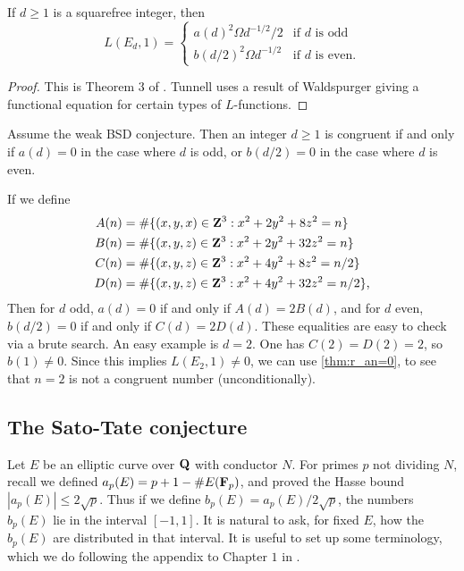 \begin{theorem}[Tunnell]
If $d\geqslant 1$ is a squarefree integer, then 
\[
  L(E_d,1) = 
    \begin{cases}
      a(d)^2 \Omega d^{-1/2}/2 & \text{if $d$ is odd} \\
      b(d/2)^2 \Omega d^{-1/2} & \text{if $d$ is even} \text{.}
    \end{cases}
\]
\end{theorem}
\begin{proof}
This is Theorem 3 of \cite{tu83}. Tunnell uses a result of Waldspurger giving 
a functional equation for certain types of $L$-functions. 
\end{proof}

\begin{corollary}
Assume the weak BSD conjecture. Then an integer $d\geqslant 1$ is congruent if 
and only if $a(d)=0$ in the case where $d$ is odd, or $b(d/2)=0$ in the case 
where $d$ is even. 
\end{corollary}

If we define 
\begin{align*}
  A(n) &= \# \{(x,y,x)\in \mathbf{Z}^3 : x^2 + 2 y^2 + 8 z^2 = n\} \\
  B(n) &= \# \{(x,y,z)\in \mathbf{Z}^3 : x^2 + 2 y^2 + 32 z^2 = n \} \\
  C(n) &= \# \{(x,y,z)\in \mathbf{Z}^3 : x^2+4 y^2 + 8 z^2 = n/2\} \\
  D(n) &= \# \{(x,y,z)\in \mathbf{Z}^3 : x^2 + 4 y^2 + 32 z^2 = n/2\} \text{,}
\end{align*}
Then for $d$ odd, $a(d) =0$ if and only if $A(d) = 2 B(d)$, and for $d$ even, 
$b(d/2) = 0$ if and only if $C(d) = 2 D(d)$. These equalities are easy to 
check via a brute search. 
An easy example is $d=2$. One has $C(2) = D(2) = 2$, so $b(1)\ne 0$. Since 
this implies $L(E_2,1)\ne 0$, we can use \autoref{thm:r_an=0}, to see 
that $n=2$ is not a congruent number (unconditionally). 





\subsection{The Sato-Tate conjecture}

Let $E$ be an elliptic curve over $\mathbf{Q}$ with conductor $N$. For primes $p$ not 
dividing $N$, recall we defined $a_p(E) = p+1-\# E(\mathbf{F}_p)$, and proved the 
Hasse bound $|a_p(E)| \leqslant 2\sqrt p$. Thus if we define 
$b_p(E) = a_p(E) /2\sqrt p$, the numbers $b_p(E)$ lie in the 
interval $[-1,1]$. It is natural to ask, for fixed $E$, how the $b_p(E)$ 
are distributed in that interval. It is useful to set up some terminology, 
which we do following the appendix to Chapter $1$ in \cite{se68}. 

